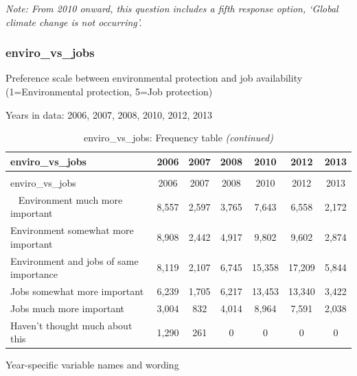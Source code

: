 \documentclass[12pt]{article}
\begin{document}
\emph{Note: From 2010 onward, this question includes a fifth response
option, `Global climate change is not occurring'.}

\subsubsection{enviro\_vs\_jobs}\label{enviro_vs_jobs}

Preference scale between environmental protection and job availability
(1=Environmental protection, 5=Job protection)

Years in data: 2006, 2007, 2008, 2010, 2012, 2013

\begin{longtable}[t]{lcccccc}
\caption{\label{tab:unnamed-chunk-4}enviro\_vs\_jobs: Frequency table}\\
\toprule
enviro\_vs\_jobs & 2006 & 2007 & 2008 & 2010 & 2012 & 2013\\
\midrule
\endfirsthead
\caption[]{enviro\_vs\_jobs: Frequency table \textit{(continued)}}\\
\toprule
enviro\_vs\_jobs & 2006 & 2007 & 2008 & 2010 & 2012 & 2013\\
\midrule
\endhead
\
\endfoot
\bottomrule
\endlastfoot
Environment much more important & 8,557 & 2,597 & 3,765 & 7,643 & 6,558 & 2,172\\
Environment somewhat more important & 8,908 & 2,442 & 4,917 & 9,802 & 9,602 & 2,874\\
Environment and jobs of same importance & 8,119 & 2,107 & 6,745 & 15,358 & 17,209 & 5,844\\
Jobs somewhat more important & 6,239 & 1,705 & 6,217 & 13,453 & 13,340 & 3,422\\
Jobs much more important & 3,004 & 832 & 4,014 & 8,964 & 7,591 & 2,038\\
Haven't thought much about this & 1,290 & 261 & 0 & 0 & 0 & 0\\*
\end{longtable}

Year-specific variable names and wording
\end{document}
